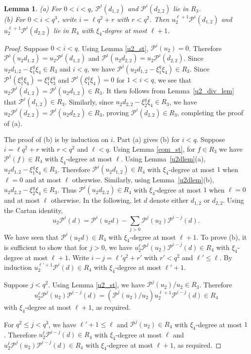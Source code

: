 \documentclass{amsart}
\newcommand{\PP}{\mathcal{P}}
\newtheorem{lem}[subsection]{Lemma}
\begin{document}
\begin{lem}\label{u2d_st} (a) For $0<i<q$, $\PP^i(d_{1,2})$ and $\PP^i(d_{2,2})$ lie in $R_3$.\\
 (b) For $0<i<q^3$, write $i=\ell q^2+r$ with $r<q^2$. Then $u_2^{\ell+1}\PP^i(d_{1,2})$ and  $u_2^{\ell+1}\PP^i(d_{2,2})$
 lie in $R_4$ with $\xi_4$-degree at most $\ell+1$.
 \end{lem}
 \begin{proof} Suppose $0<i<q$. Using Lemma \ref{u2_st}, $\PP^i(u_2)=0$. Therefore $\PP^i(u_2d_{1,2})=u_2\PP^i(d_{1,2})$ and
 $\PP^i(u_2d_{2,2})=u_2\PP^i(d_{2,2})$. Since $u_2d_{1,2}-\xi_1^q\xi_4\in R_3$ and $i<q$, we have 
 $\PP^i(u_2d_{1,2}-\xi_1^q\xi_4)\in R_3$. 
 Since $\PP^1(\xi_1^q\xi_4)=\xi_1^q\xi_3^q$ and $\PP^i(\xi_1^q\xi_4)=0$ for $1<i<q$, 
 we see that 
 $u_2\PP^i(d_{1,2})=\PP^i(u_2d_{1,2})\in R_3$.
 It then follows from Lemma~\ref{u2_div_lem} that $\PP^i(d_{1,2})\in R_3$.
 Similarly, since $u_2d_{2,2}-\xi_2^q\xi_4\in R_3$, we have 
 $u_2\PP^i(d_{2,2})=\PP^i(u_2d_{2,2})\in R_3$, proving $\PP^i(d_{2,2})\in R_3$,
 completing the proof of (a).
 
The proof of (b) is by induction on $i$. Part (a) gives (b) for $i<q$. 
Suppose  $i=\ell q^2+r$ with $r<q^2$ and $\ell<q$. Using Lemma \ref{com_st}, for $f\in R_3$ we have $\PP^i(f)\in R_4$ with $\xi_4$-degree at most $\ell$.
 Using Lemma~\ref{u2dlem}(a), $u_2d_{1,2}-\xi_1^q\xi_4\in R_3$. Therefore $\PP^i(u_2d_{1,2})\in R_4$ with $\xi_4$-degree at most $1$ when $\ell=0$ and at most $\ell$ otherwise.
 Similarly, using Lemma~\ref{u2dlem}(b), $u_2d_{2,2}-\xi_2^q\xi_4\in R_3$. Thus  $\PP^i(u_2d_{2,2})\in R_4$ with 
 $\xi_4$-degree at most $1$ when $\ell=0$ and at most $\ell$ otherwise. In the following, let $d$ denote either $d_{1,2}$ or $d_{2,2}$.
 Using the Cartan identity,
 $$u_2\PP^i(d)=\PP^i(u_2d)-\sum_{j>0}\PP^j(u_2)\PP^{i-j}(d).$$
 We have seen that $\PP^i(u_2d)\in R_4$ with $\xi_4$-degree at most $\ell+1$. 
 To prove (b), it is sufficient to show that for $j>0$, we have $u_2^\ell \PP^j(u_2)\PP^{i-j}(d)\in R_4$ with
 $\xi_4$-degree at most $\ell+1$. 
 Write $i-j=\ell' q^2+r'$ with $r'<q^2$ and $\ell'\leq\ell$. By induction $u_2^{\ell'+1}\PP^i(d)\in R_4$
 with $\xi_4$-degree at most $\ell'+1$.
 
 Suppose $j<q^2$. Using Lemma \ref{u2_st}, we have $\PP^j(u_2)/u_2\in R_3$.
 Therefore $$u_2^\ell \PP^j(u_2)\PP^{i-j}(d)=(\PP^j(u_2)/u_2)u_2^{\ell+1}\PP^{i-j}(d)\in R_4$$ with $\xi_4$-degree at most $\ell+1$, as required.
 
For $q^2\leq j< q^3$, we  have $\ell'+1\leq \ell$ and $\PP^j(u_2)\in R_4$ with $\xi_4$-degree at most $1$.
Therefore $u_2^\ell\PP^{i-j}(d)\in R_4$ with $\xi_4$-degree at most $\ell$ and $u_2^\ell \PP^j(u_2)\PP^{i-j}(d)\in R_4$ with
 $\xi_4$-degree at most $\ell+1$, as required.
\end{proof}
\end{document}
